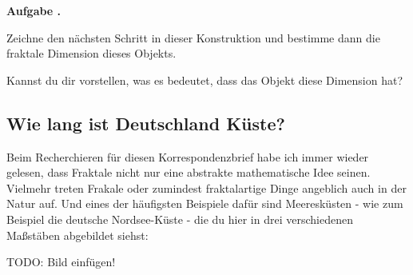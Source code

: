\documentclass[a4paper,ngerman,12pt]{scrartcl}
\theoremstyle{definition}
\theoremstyle{plain}
\theoremstyle{remark}
\newlength{\aufgabenskip}
\newcounter{aufgabennummer}
\newenvironment{aufgabe}[1]{
  \addtocounter{aufgabennummer}{1}
  \textbf{Aufgabe \theaufgabennummer.} \emph{#1} \par
}{\vspace{\aufgabenskip}}
\begin{document}
\begin{aufgabe}{}
	Zeichne den nächsten Schritt in dieser Konstruktion und bestimme dann die fraktale Dimension dieses Objekts.
	
	Kannst du dir vorstellen, was es bedeutet, dass das Objekt diese Dimension hat?
\end{aufgabe}

\subsection{Wie lang ist Deutschland Küste?}

Beim Recherchieren für diesen Korrespondenzbrief habe ich immer wieder gelesen, dass Fraktale nicht nur eine abstrakte mathematische Idee seinen. Vielmehr treten Frakale oder zumindest fraktalartige Dinge angeblich auch in der Natur auf. Und eines der häufigsten Beispiele dafür sind Meeresküsten - wie zum Beispiel die deutsche Nordsee-Küste - die du hier in drei verschiedenen Maßstäben abgebildet siehst:

TODO: Bild einfügen!
\end{document}
